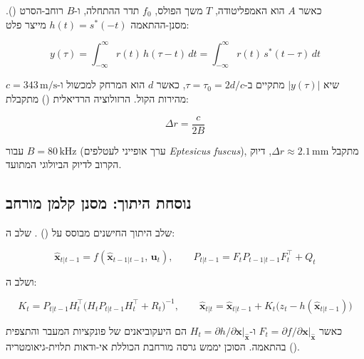 כאשר $A$ הוא האמפליטודה, $T$ משך הפולס, $f_0$ תדר ההתחלה,
ו-$B$ רוחב-הסרט ().
מסנן-ההתאמה $h(t) = s^*(-t)$ מייצר פלט:

\begin{equation}
    y(\tau)
    = \int_{-\infty}^{\infty} r(t)\, h(\tau - t)\, dt
    = \int_{-\infty}^{\infty} r(t)\, s^*(t - \tau)\, dt
    \label{eq:matched_filter}
\end{equation}

שיא $|y(\tau)|$ מתקיים ב-$\tau = \tau_0 = 2d/c$,
כאשר $d$ הוא המרחק למכשול ו-$c = 343\,\text{m/s}$ מהירות הקול.
הרזולוציה הרדיאלית () מתקבלת:

\begin{equation}
    \Delta r = \frac{c}{2B}
    \label{eq:range_resolution}
\end{equation}

עבור $B = 80\,\text{kHz}$ (ערך אופייני לעטלפים \textit{Eptesicus fuscus}),
מתקבל $\Delta r \approx 2.1\,\text{mm}$,
דיוק הקרוב לדיוק הביולוגי המתועד. \cite{Simmons1979BatSonar}

\subsection{נוסחת היתוך: מסנן קלמן מורחב}
\label{subsec:ekf}

שלב היתוך החישנים מבוסס על 
() \cite{Kalman1960}.
שלב ה:

\begin{equation}
    \hat{\mathbf{x}}_{t|t-1} = f(\hat{\mathbf{x}}_{t-1|t-1},\, \mathbf{u}_t),
    \qquad
    P_{t|t-1} = F_t P_{t-1|t-1} F_t^{\top} + Q_t
    \label{eq:ekf_predict}
\end{equation}

ושלב ה:

\begin{equation}
    K_t = P_{t|t-1} H_t^{\top}
          \bigl(H_t P_{t|t-1} H_t^{\top} + R_t\bigr)^{-1},
    \qquad
    \hat{\mathbf{x}}_{t|t} = \hat{\mathbf{x}}_{t|t-1}
                              + K_t\bigl(z_t - h(\hat{\mathbf{x}}_{t|t-1})\bigr)
    \label{eq:ekf_update}
\end{equation}

כאשר $F_t = \partial f/\partial \mathbf{x}\big|_{\hat{\mathbf{x}}}$
ו-$H_t = \partial h/\partial \mathbf{x}\big|_{\hat{\mathbf{x}}}$
הם היעקוביאנים של פונקציות המעבר והתצפית בהתאמה.
הסוכן  יממש גרסה מורחבת הכוללת
אי-ודאות תלוית-גיאומטריה (). \cite{MurArtal2015ORB}

